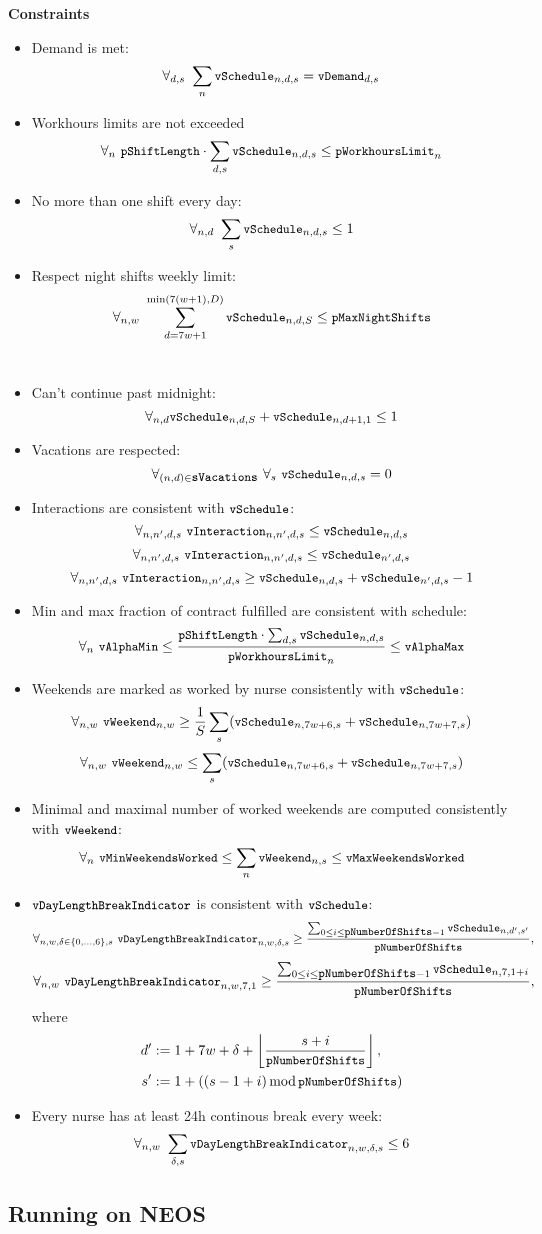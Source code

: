 \noindent\textbf{Constraints}
\begin{itemize}
    \item Demand is met:
    \[ \forall_{d,s}\ \sum_n \texttt{\small vSchedule}_{n,d,s} = \texttt{\small vDemand}_{d, s} \]
    \item Workhours limits are not exceeded
    \[ \forall_{n}\ \texttt{\small pShiftLength}\cdot\sum_{d, s} \texttt{\small vSchedule}_{n,d,s} \leq \texttt{\small pWorkhoursLimit}_n \]
    \item No more than one shift every day:
    \[ \forall_{n,d}\ \sum_s \texttt{\small vSchedule}_{n,d,s} \leq 1 \]
    \item Respect night shifts weekly limit:
    \[ \forall_{n,w}\ \sum_{d=7w+1}^{\min(7(w+1), D)} \texttt{\small vSchedule}_{n,d,S} \leq \texttt{\small pMaxNightShifts} \] \\
    \item Can't continue past midnight:
    \[ \forall_{n,d} \texttt{\small vSchedule}_{n,d,S} + \texttt{\small vSchedule}_{n,d+1,1} \leq 1 \]
    \item Vacations are respected:
    \[ \forall_{(n,d)\in \sVacations}\ \forall_s\ \vSchedule_{n,d,s} = 0 \]
    \item Interactions are consistent with $\texttt{\small vSchedule}$: 
    \[ \forall_{n,n',d,s}\ \texttt{\small vInteraction}_{n,n',d,s} \leq \texttt{\small vSchedule}_{n,d,s} \]
    \[ \forall_{n,n',d,s}\ \texttt{\small vInteraction}_{n,n',d,s} \leq \texttt{\small vSchedule}_{n',d,s} \]
    \[ \forall_{n,n',d,s}\ \texttt{\small vInteraction}_{n,n',d,s} \geq \texttt{\small vSchedule}_{n,d,s} + \texttt{\small vSchedule}_{n',d,s} - 1 \]
    \item Min and max fraction of contract fulfilled are consistent with schedule:
    \[ \forall_{n}\ \texttt{\small vAlphaMin} \leq \frac{\texttt{\small pShiftLength} \cdot \sum_{d,s} \texttt{\small vSchedule}_{n,d,s}}{\texttt{\small pWorkhoursLimit}_n} \leq \texttt{\small vAlphaMax} \]
    \item Weekends are marked as worked by nurse consistently with $\texttt{\small vSchedule}$: 
    \[ \forall_{n, w}\ \texttt{\small vWeekend}_{n, w} \geq \frac{1}{S}\sum_s (\texttt{\small vSchedule}_{n, 7w+6, s} + \texttt{\small vSchedule}_{n, 7w+7, s}) \]
    \[ \forall_{n, w}\ \texttt{\small vWeekend}_{n, w} \leq \sum_s (\texttt{\small vSchedule}_{n, 7w+6, s} + \texttt{\small vSchedule}_{n, 7w+7, s}) \]
    \item Minimal and maximal number of worked weekends are computed consistently with $\texttt{\small vWeekend}$:
    \[ \forall_{n}\ \texttt{\small vMinWeekendsWorked} \le \sum_n \texttt{\small vWeekend}_{n, s} \le \texttt{\small vMaxWeekendsWorked} \]
    \item $\texttt{\small vDayLengthBreakIndicator}$ is consistent with $\texttt{\small vSchedule}$:
    \[ \forall_{n,w,\delta  \in \{0, \dots, 6\},s}\ \vDayLengthBreakIndicator_{n, w, \delta, s} \ge \frac{\sum_{0 \le i \le \pNumberOfShifts - 1} \vSchedule_{n, d', s'}}{\pNumberOfShifts}, \]
    \[ \forall_{n,w}\ \texttt{\small vDayLengthBreakIndicator}_{n, w, 7, 1} \ge \frac{\sum_{0 \le i \le \texttt{\small pNumberOfShifts} - 1} \texttt{\small vSchedule}_{n, 7, 1 + i}}{\texttt{\small pNumberOfShifts}}, \]
    where
    \begin{align*}
        d' &:= 1+7w+\delta+\left\lfloor\frac{s+i}{\texttt{\small pNumberOfShifts}}\right\rfloor, \\
        s' &:= 1 + ((s - 1 + i) \operatorname{mod} \texttt{\small pNumberOfShifts})
    \end{align*}
    \item Every nurse has at least 24h continous break every week:
    \[ \forall_{n, w}\ \sum_{\delta, s} \texttt{\small vDayLengthBreakIndicator}_{n, w, \delta, s} \le 6 \]
\end{itemize}

\subsection{Running on NEOS}
